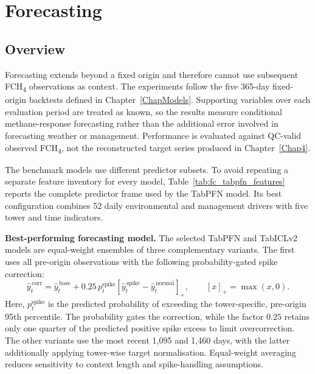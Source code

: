 \chapter{Forecasting} \label{Chap5}

\section{Overview}

Forecasting extends beyond a fixed origin and therefore cannot use subsequent
FCH\textsubscript{4} observations as context. The experiments follow the five
365-day fixed-origin backtests defined in Chapter~\ref{ChapModels}. Supporting
variables over each evaluation period are treated as known, so the results
measure conditional methane-response forecasting rather than the additional
error involved in forecasting weather or management. Performance is evaluated
against QC-valid observed FCH\textsubscript{4}, not the reconstructed target
series produced in Chapter~\ref{Chap4}.

The benchmark models use different predictor subsets. To avoid repeating a
separate feature inventory for every model, Table~\ref{tab:fc_tabpfn_features}
reports the complete predictor frame used by the TabPFN model. Its best
configuration combines 52 daily environmental and
management drivers with five tower and time indicators. 


\noindent\textbf{Best-performing forecasting model.}
The selected TabPFN and TabICLv2 models are equal-weight ensembles of three complementary
variants. The first uses all pre-origin observations with the following
probability-gated spike correction:
\[
\widehat{y}^{\,\mathrm{corr}}_t
=
\widehat{y}^{\,\mathrm{base}}_t
+
0.25\,p^{\mathrm{spike}}_t
\left[
\widehat{y}^{\,\mathrm{spike}}_t
-
\widehat{y}^{\,\mathrm{normal}}_t
\right]_{+},
\qquad [x]_{+}=\max(x,0).
\]
Here, \(p^{\mathrm{spike}}_t\) is the predicted probability of exceeding the
tower-specific, pre-origin 95th percentile. The probability gates the
correction, while the factor \(0.25\) retains only one quarter of the predicted
positive spike excess to limit overcorrection. The other variants use the most
recent 1,095 and 1,460 days, with the latter additionally applying tower-wise 
target normalisation. Equal-weight averaging reduces sensitivity to
context length and spike-handling assumptions.

